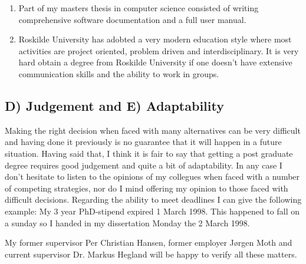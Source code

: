 \documentclass[12pt,a4paper]{article}
\begin{document}
\begin{enumerate}
 \item Part of my masters thesis in computer science 
 consisted of writing comprehensive software documentation and
 a full user manual. 
 \item Roskilde University has adobted a very modern education style where
 most activities are project oriented, problem driven and  
 interdisciplinary. It is very hard obtain a degree from 
 Roskilde University if one doesn't have extensive communication 
 skills and the ability to work in groups. 
\end{enumerate} 
    
\subsection*{D) Judgement and E) Adaptability}    

  Making the right decision when faced with many alternatives
  can be very difficult and having done it previously is no guarantee
  that it will happen in a future situation. Having said that,
  I think it is fair to say that getting a post graduate degree
  requires good judgement and quite a bit of adaptability.
  In any case I don't hesitate to listen to the opinions of
  my collegues when faced with a number of competing strategies, 
  nor do I mind offering my opinion to those faced with difficult decisions.
  Regarding the ability to meet deadlines I can give the following example:   
  My 3 year PhD-stipend expired 1 March 1998. This happened to fall
  on a sunday so I handed in my dissertation Monday the 2 March 1998.
  
  My former supervisor Per Christian Hansen, 
  former employer J{\o}rgen Moth and current supervisor
  Dr. Markus Hegland will be happy to verify all these matters.
\end{document}
